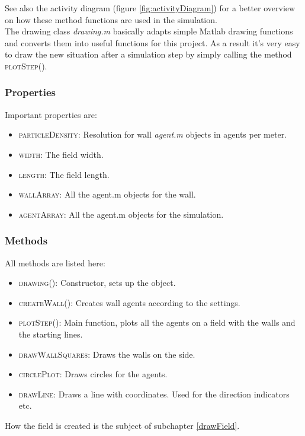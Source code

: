 \noi See also the activity diagram (figure \ref{fig:activityDiagram}) for a better overview on how these method functions are used in the simulation.\\

\noi The drawing class \textit{drawing.m} basically adapts simple Matlab drawing functions and converts them into useful functions for this project. As a result it's very easy to draw the new situation after a simulation step by simply calling the method \textsc{plotStep()}.
\pagebreak

\subsubsection{Properties}
Important properties are:
\begin{itemize}
\item \textsc{particleDensity}: Resolution for wall \textit{agent.m} objects in agents per meter.
\item \textsc{width}: The field width.
\item \textsc{length}: The field length.
\item \textsc{wallArray}: All the agent.m objects for the wall.
\item \textsc{agentArray}: All the agent.m objects for the simulation.
\end{itemize}

\subsubsection{Methods}
All methods are listed here:
\begin{itemize}
\item \textsc{drawing()}: Constructor, sets up the object.
\item \textsc{createWall()}: Creates wall agents according to the settings.
\item \textsc{plotStep()}: Main function, plots all the agents on a field with the walls and the starting lines. 
\item \textsc{drawWallSquares}: Draws the walls on the side.
\item \textsc{circlePlot}: Draws circles for the agents.
\item \textsc{drawLine}: Draws a line with coordinates. Used for the direction indicators etc.
\end{itemize}
\noi How the field is created is the subject of subchapter \ref{drawField}.

